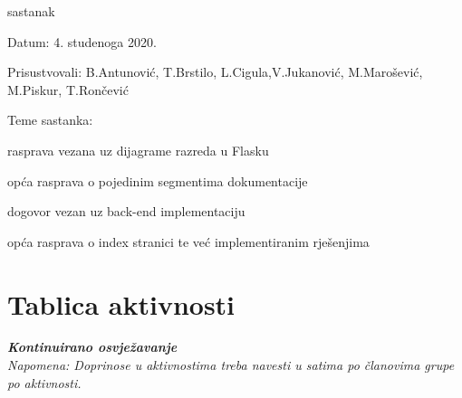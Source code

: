 \begin{packed_enum}
			\item  sastanak
			\item[] \begin{packed_item}
				\item Datum: 4. studenoga 2020.
				\item Prisustvovali: B.Antunović, T.Brstilo, L.Cigula,V.Jukanović, M.Marošević, M.Piskur, T.Rončević
				\item Teme sastanka:
				\begin{packed_item}
					\item  rasprava vezana uz dijagrame razreda u Flasku
					\item  opća rasprava o pojedinim segmentima dokumentacije
					\item  dogovor vezan uz back-end implementaciju
					\item  opća rasprava o index stranici te već implementiranim rješenjima
				\end{packed_item}
			\end{packed_item}	
			
			
		\end{packed_enum}
		
		\eject
		\section*{Tablica aktivnosti}
		
			\textbf{\textit{Kontinuirano osvježavanje}}\\
			
			 \textit{Napomena: Doprinose u aktivnostima treba navesti u satima po članovima grupe po aktivnosti.}
					
						
			
